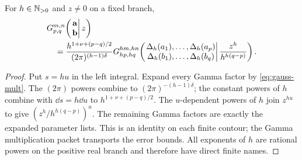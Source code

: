 \begin{theorem}\label{thm:multiplication}
For $h\in\mathbb N_{>0}$ and $z\ne0$ on a fixed branch,
\begin{align}
&G_{p,q}^{m,n}\!\left(
 \left.\begin{matrix}\mathbf a\\\mathbf b\end{matrix}\right|z\right)\notag\\
&\quad=
\frac{h^{1+\nu+(p-q)/2}}{(2\pi)^{(h-1)\delta}}
G_{hp,hq}^{hm,hn}\!\left(
 \left.\begin{matrix}\Delta_h(a_1),\ldots,\Delta_h(a_p)\\
                       \Delta_h(b_1),\ldots,\Delta_h(b_q)
 \end{matrix}\right|
 \frac{z^h}{h^{h(q-p)}}\right).
\label{eq:meijer-multiplication}
\end{align}
\end{theorem}
\begin{proof}
Put $s=hu$ in the left integral.  Expand every Gamma factor by
\eqref{eq:gauss-mult}.  The $(2\pi)$ powers combine to
$(2\pi)^{-(h-1)\delta}$; the constant powers of $h$ combine with $\dd s=h\dd u$
to $h^{1+\nu+(p-q)/2}$.  The $u$-dependent powers of $h$ join $z^{hu}$ to give
$(z^h/h^{h(q-p)})^u$.  The remaining Gamma factors are exactly the expanded
parameter lists.  This is an identity on each finite contour; the Gamma
multiplication packet transports the error bounds.  All exponents of $h$ are
rational powers on the positive real branch and therefore have direct finite
names.
\end{proof}
